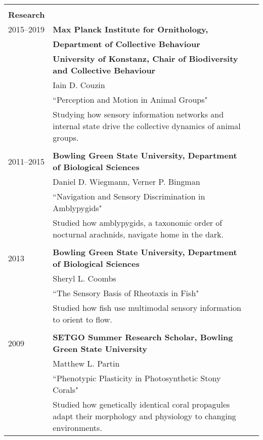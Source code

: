 \documentclass[letterpaper,10pt,oneside]{article}
\begin{document}
\begin{longtable}{@{} l p{5.3in}l}
 & \\ 


 \Large{\textbf{Research}}  \vspace{5mm} \\
 
 \large{2015–2019}
     & \textbf{Max Planck Institute for Ornithology,}\\
     	& \textbf{Department of Collective Behaviour} \\
        & \textbf{University of Konstanz, Chair of Biodiversity and Collective Behaviour} \\
     & Iain D. Couzin \\
     & ``Perception and Motion in Animal Groups"  \vspace{1mm}\\
     & \parbox{5.0in}{Studying how sensory information networks and internal state drive the collective dynamics of animal groups.}\\
     & \\ 
 \large{2011–2015}
     & \textbf{Bowling Green State University, Department of Biological Sciences} \\
     & Daniel D. Wiegmann, Verner P. Bingman \\
     & ``Navigation and Sensory Discrimination in Amblypygids" \vspace{1mm}\\
     & \parbox{5.0in}{Studied how amblypygids, a taxonomic order of nocturnal arachnids, navigate home in the dark. }\\
     & \\
 \large{2013}
     & \textbf{Bowling Green State University, Department of Biological Sciences} \\
     & Sheryl L. Coombs \\
     & ``The Sensory Basis of Rheotaxis in Fish" \vspace{1mm}\\
     & \parbox{5.0in}{Studied how fish use multimodal sensory information to orient to flow.}\\
     & \\
 \large{2009}
     & \textbf{SETGO Summer Research Scholar, Bowling Green State University} \\
     & Matthew L. Partin \\
     & ``Phenotypic Plasticity in Photosynthetic Stony Corals" \vspace{1mm}\\
     & \parbox{5.0in}{Studied how genetically identical coral propagules adapt their morphology and physiology to changing environments.}\\

\end{longtable}
\end{document}
